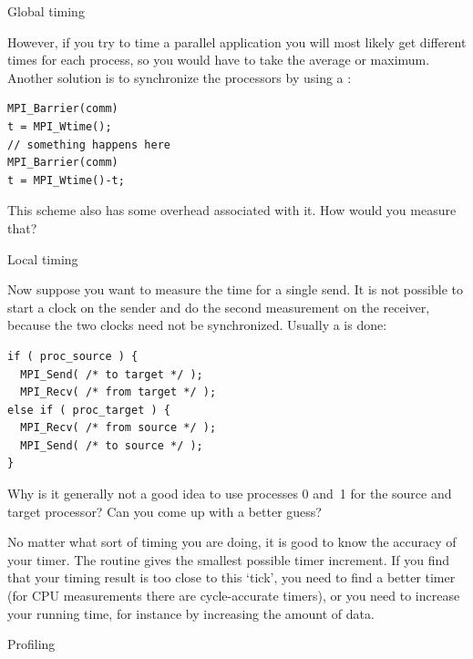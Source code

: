  {Global timing}

However, if you try to time a parallel application you will most likely
get different times for each process, so you would have to take the
average or maximum.  Another solution is to synchronize the processors
by using a :
\begin{lstlisting}
MPI_Barrier(comm)
t = MPI_Wtime();
// something happens here
MPI_Barrier(comm)
t = MPI_Wtime()-t;
\end{lstlisting}

\begin{exercise}
  This scheme also has some overhead associated with it. How would you measure that?
\end{exercise}

 {Local timing}
\label{sec:ping-time}

Now suppose you want to measure the time for a single send. It is not possible
to start a clock on the sender and do the second measurement on the receiver,
because the two clocks need not be synchronized. Usually a  is 
done: 
\begin{lstlisting}
if ( proc_source ) {
  MPI_Send( /* to target */ );
  MPI_Recv( /* from target */ );
else if ( proc_target ) {
  MPI_Recv( /* from source */ );
  MPI_Send( /* to source */ );
}
\end{lstlisting}

\begin{exercise}
  Why is it generally not a good idea to use processes 0 and~1 for the
  source and target processor?  Can you come up with a better guess?
\end{exercise}

No matter what sort of timing you are doing, it is good to know the accuracy of your timer.
The routine  gives the smallest possible timer increment.
If you find that your timing result is too close to this `tick', you need to find a better timer
(for CPU measurements there are cycle-accurate timers), or you need to increase
your running time, for instance by increasing the amount of data.


 {Profiling}
\label{sec:profile}


